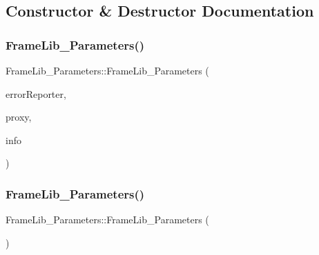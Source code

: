 \subsection{Constructor \& Destructor Documentation}
\mbox{\label{class_frame_lib___parameters_a4adc6d011e6a9842dc11025789dcda27}} 
\subsubsection{\texorpdfstring{Frame\+Lib\+\_\+\+Parameters()}{FrameLib\_Parameters()}\hspace{0.1cm}{\footnotesize\ttfamily [1/2]}}
{\footnotesize\ttfamily Frame\+Lib\+\_\+\+Parameters\+::\+Frame\+Lib\+\_\+\+Parameters (\begin{DoxyParamCaption}\item[{\hyperlink{class_frame_lib___error_reporter}{Frame\+Lib\+\_\+\+Error\+Reporter} \&}]{error\+Reporter,  }\item[{\hyperlink{struct_frame_lib___proxy}{Frame\+Lib\+\_\+\+Proxy} $\ast$}]{proxy,  }\item[{\hyperlink{class_frame_lib___parameters_1_1_info}{Info} $\ast$}]{info }\end{DoxyParamCaption})\hspace{0.3cm}{\ttfamily [inline]}}

\mbox{\label{class_frame_lib___parameters_a45a182e2dc59c805b148f36571fe93a6}} 
\subsubsection{\texorpdfstring{Frame\+Lib\+\_\+\+Parameters()}{FrameLib\_Parameters()}\hspace{0.1cm}{\footnotesize\ttfamily [2/2]}}
{\footnotesize\ttfamily Frame\+Lib\+\_\+\+Parameters\+::\+Frame\+Lib\+\_\+\+Parameters (\begin{DoxyParamCaption}\item[{const \hyperlink{class_frame_lib___parameters}{Frame\+Lib\+\_\+\+Parameters} \&}]{ }\end{DoxyParamCaption})\hspace{0.3cm}{\ttfamily [delete]}}



